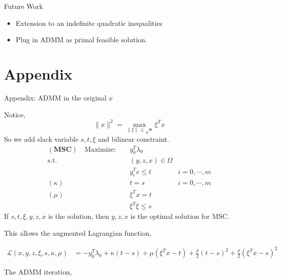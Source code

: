 \documentclass[aspectratio=1610, 9pt]{beamer}
\newcommand{\model}[1]{(\textbf{#1})}
\begin{document}
\begin{frame}[allowframebreaks]{Future Work}
  \begin{itemize}
    \item Extension to an indefinite quadratic inequalities
    \item Plug in ADMM as primal feasible solution.
  \end{itemize}
\end{frame}

\section{Appendix}
\begin{frame}[allowframebreaks]{\hypertarget{oldad}{Appendix: ADMM in the original \(x\)}}

  Notice,
  \begin{equation}
    \|x\|^2 = \max_{\|\xi\| \le \sqrt s} \xi^T x
  \end{equation}
  So we add slack variable \(s, t, \xi\) and bilinear constraint.
  \begin{align}
    \model{MSC} \quad \mathrm{Maximize: }\quad & y_0 ^T\lambda_0                     \\
    \mathrm{s.t.} \quad                        & (y,z,x) \in \Omega                  \\
                                               & y_i^Te \le t       & i=0, \cdots, m \\
    (\kappa) \quad                             & t= s               & i=0, \cdots, m \\
    (\mu)    \quad                             & \xi^Tx = t                          \\
                                               & \xi^T\xi \le s
  \end{align}
  If \(s, t, \xi, y, z, x\) is the solution, then \( y, z, x\) is the optimal solution for MSC.

  This allows the augmented Lagrangian function,

  \begin{align*}
    \mathscr L\left(x,y,z,\xi,s,\kappa,\mu\right) & = - y_0 ^T\lambda_0 + \kappa(t-s) + \mu(\xi^Tx - t) + \frac{\rho}{2}(t-s)^2 + \frac{\rho}{2}(\xi^Tx - s)^2
  \end{align*}

  The ADMM iteration,


\end{frame}
\end{document}
